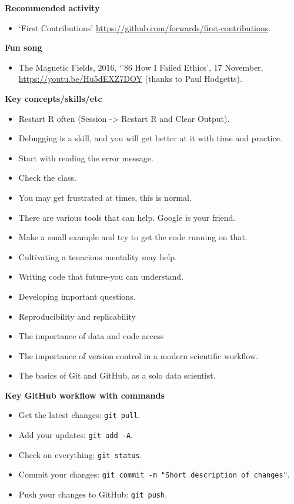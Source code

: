\documentclass[
]{book}
\providecommand{\tightlist}{%
  \setlength{\itemsep}{0pt}\setlength{\parskip}{0pt}}
\begin{document}
\textbf{Recommended activity}

\begin{itemize}
\tightlist
\item
  `First Contributions' \url{https://github.com/forwards/first-contributions}.
\end{itemize}

\textbf{Fun song}

\begin{itemize}
\tightlist
\item
  The Magnetic Fields, 2016, `'86 How I Failed Ethics', 17 November, \url{https://youtu.be/Hu5dEXZ7DOY} (thanks to Paul Hodgetts).
\end{itemize}

\textbf{Key concepts/skills/etc}

\begin{itemize}
\tightlist
\item
  Restart R often (Session -\textgreater{} Restart R and Clear Output).
\item
  Debugging is a skill, and you will get better at it with time and practice.
\item
  Start with reading the error message.
\item
  Check the class.
\item
  You may get frustrated at times, this is normal.
\item
  There are various tools that can help. Google is your friend.
\item
  Make a small example and try to get the code running on that.
\item
  Cultivating a tenacious mentality may help.
\item
  Writing code that future-you can understand.
\item
  Developing important questions.
\item
  Reproducibility and replicability
\item
  The importance of data and code access
\item
  The importance of version control in a modern scientific workflow.
\item
  The basics of Git and GitHub, as a solo data scientist.
\end{itemize}

\textbf{Key GitHub workflow with commands}

\begin{itemize}
\tightlist
\item
  Get the latest changes: \texttt{git\ pull}.
\item
  Add your updates: \texttt{git\ add\ -A}.
\item
  Check on everything: \texttt{git\ status}.
\item
  Commit your changes: \texttt{git\ commit\ -m\ "Short\ description\ of\ changes"}.
\item
  Push your changes to GitHub: \texttt{git\ push}.
\end{itemize}
\end{document}
